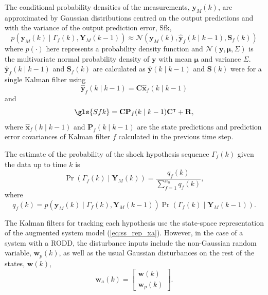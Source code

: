 The conditional probability densities of the measurements, $\mathbf{y}_M(k)$, are approximated by Gaussian distributions centred on the output predictions and with the variance of the output prediction error, \gls{Sfk},
\begin{equation} \label{eq:p_yk_given_Gammak_Ykm1}
	p(\mathbf{y}_M(k) \mid \Gamma_f(k), \mathbf{Y}_M(k-1)) \approx \mathcal{N}\left(\mathbf{y}_M(k), \mathbf{\hat{y}}_{f}(k \mid k-1),	\mathbf{S}_f(k) \right)
\end{equation}
%
where $p(\cdot)$ here represents a probability density function and $\mathcal{N}(\mathbf{y}, \mathbf{\mu}, \Sigma)$ is the multivariate normal probability density of $\mathbf{y}$ with mean $\mathbf{\mu}$ and variance $\Sigma$. $\mathbf{\hat{y}}_{f}(k \mid k-1)$ and $\mathbf{S}_f(k)$ are calculated as $\mathbf{\hat{y}}(k \mid k-1)$ and $\mathbf{S}(k)$ were for a single Kalman filter using 
\begin{equation} \label{eq:yfk_pred}
	\mathbf{\hat{y}}_{f}(k \mid k-1) = \mathbf{C}\mathbf{\hat{x}}_{f}(k \mid k-1)
\end{equation}
and
\begin{equation} \label{eq:Sfk}
	\gls{Sfk} = \mathbf{C}\mathbf{P}_f(k \mid k-1)\mathbf{C}^\intercal + \mathbf{R},
\end{equation}
where $\mathbf{\hat{x}}_{f}(k \mid k-1)$ and $\mathbf{P}_f(k \mid k-1)$ are the state predictions and prediction error covariances of Kalman filter $f$ calculated in the previous time step.

The estimate of the probability of the shock hypothesis sequence $\Gamma_f(k)$ given the data up to time $k$ is
\begin{equation} \label{eq:Pr_Gammak_given_Yk}
	\Pr(\Gamma_f(k) \mid \mathbf{Y}_M(k)) = \frac{q_f(k)}{\sum_{f=1}^{n_h} q_f(k)},
\end{equation}
where
\begin{equation} \label{eq:qfk}
	q_f(k) = p(\mathbf{y}_M(k) \mid \Gamma_f(k), \mathbf{Y}_M(k-1)) \Pr(\Gamma_f(k) \mid \mathbf{Y}_M(k-1)).
\end{equation}

The Kalman filters for tracking each hypothesis use the state-space representation of the augmented system model (\ref{eq:ss_rep_xa}). 
However, in the case of a system with a \gls{RODD}, the disturbance inputs include the non-Gaussian random variable, $\mathbf{w}_p(k)$, as well as the usual Gaussian disturbances on the rest of the states, $\mathbf{w}(k)$,
\begin{equation} \label{eq:wak}
	\mathbf{w}_a(k) = \begin{bmatrix}
		\mathbf{w}(k) \\
		\mathbf{w}_p(k)
	\end{bmatrix}.
\end{equation}

